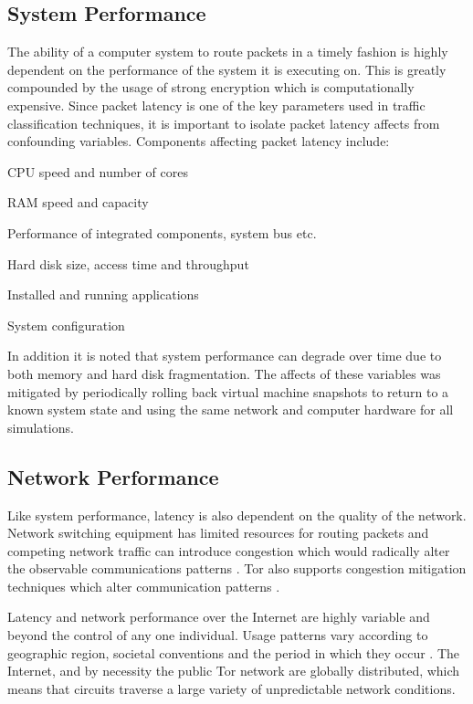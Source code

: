 \documentclass{ecuthesis}
\begin{document}
\subsection{System Performance}

The ability of a computer system to route packets in a timely fashion is highly
dependent on the performance of the system it is executing on. This is greatly
compounded by the usage of strong encryption which is computationally expensive.
Since packet latency is one of the key parameters used in traffic classification
techniques, it is important to isolate packet latency affects from confounding
variables. Components affecting packet latency include:

\begin{itemize*}
  \item CPU speed and number of cores
  \item RAM speed and capacity
  \item Performance of integrated components, system bus etc.
  \item Hard disk size, access time and throughput
  \item Installed and running applications
  \item System configuration
\end{itemize*}

In addition it is noted that system performance can degrade over time due to
both memory and hard disk fragmentation. The affects of these variables was
mitigated by periodically rolling back virtual machine snapshots to return to a
known system state and using the same network and computer hardware for all
simulations.

\subsection{Network Performance}

Like system performance, latency is also dependent on the quality of the
network. Network switching equipment has limited resources for routing packets
and competing network traffic can introduce congestion which would radically
alter the observable communications patterns \parencite{Jacobson:1995p6768}.
Tor also supports congestion mitigation techniques which alter communication
patterns \parencite[8]{Dingledine:2004p314}.

Latency and network performance over the Internet are highly variable and
beyond the control of any one individual. Usage patterns vary according to
geographic region, societal conventions and the period in which they occur
\parencite{Thompson97wide-areainternet,Ken03longitudinalstudy}. The Internet,
and by necessity the public Tor network are globally distributed, which means
that circuits traverse a large variety of unpredictable network conditions.
\end{document}
